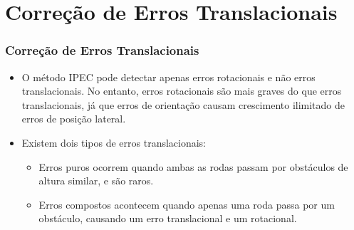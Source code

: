 \documentclass[xcolor=dvipsnames, aspectratio=169]{beamer}
\begin{document}
\section{Correção de Erros Translacionais}
\begin{frame}
  \frametitle{Correção de Erros Translacionais}
  \begin{itemize}
    \item O método IPEC pode detectar apenas erros rotacionais e não erros translacionais. No entanto, erros rotacionais são mais graves do que erros translacionais, já que erros de orientação causam crescimento ilimitado de erros de posição lateral.
        
    \item Existem dois tipos de erros translacionais: 
    \begin{itemize}
      \item Erros puros ocorrem quando ambas as rodas passam por obstáculos de altura similar, e são raros. 
      \item Erros compostos acontecem quando apenas uma roda passa por um obstáculo, causando um erro translacional e um rotacional.
    \end{itemize}
        

\end{itemize}
\end{frame}
\end{document}
